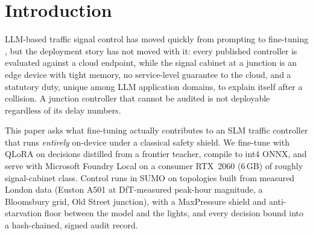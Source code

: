 \documentclass[conference]{IEEEtran}
\begin{document}
\section{Introduction}\label{sec:intro}
LLM-based traffic signal control has moved quickly from prompting to
fine-tuning \cite{lai2023llmlight,wang2025trafficr1,curalight2026}, but the
deployment story has not moved with it: every published controller is
evaluated against a cloud endpoint, while the signal cabinet at a junction is
an edge device with tight memory, no service-level guarantee to the cloud, and
a statutory duty, unique among LLM application domains, to explain itself
after a collision. A junction controller that cannot be audited is not
deployable regardless of its delay numbers.

This paper asks what fine-tuning actually contributes to an SLM traffic
controller that runs \emph{entirely} on-device under a classical safety
shield. We fine-tune with QLoRA \cite{dettmers2023qlora} on decisions
distilled from a frontier teacher, compile to int4 ONNX, and serve with
Microsoft Foundry Local on a consumer RTX~2060 (6\,GB) of roughly
signal-cabinet class. Control runs in SUMO on topologies built from
measured London data (Euston A501 at DfT-measured peak-hour magnitude, a Bloomsbury grid,
Old Street junction), with a MaxPressure \cite{varaiya2013maxpressure} shield
and anti-starvation floor between the model and the lights, and every decision
bound into a hash-chained, signed audit record.
\end{document}
